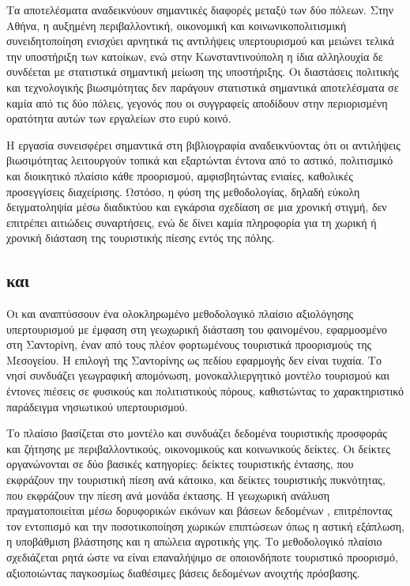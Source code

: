 Τα αποτελέσματα αναδεικνύουν σημαντικές διαφορές μεταξύ των δύο πόλεων.
Στην Αθήνα, η αυξημένη περιβαλλοντική, οικονομική και κοινωνικοπολιτισμική
συνειδητοποίηση ενισχύει αρνητικά τις αντιλήψεις υπερτουρισμού και μειώνει
τελικά την υποστήριξη των κατοίκων, ενώ στην Κωνσταντινούπολη η ίδια
αλληλουχία δε συνδέεται με στατιστικά σημαντική μείωση της υποστήριξης.
Οι διαστάσεις πολιτικής και τεχνολογικής βιωσιμότητας δεν παράγουν
στατιστικά σημαντικά αποτελέσματα σε καμία από τις δύο πόλεις, γεγονός που
οι συγγραφείς αποδίδουν στην περιορισμένη ορατότητα αυτών των εργαλείων
στο ευρύ κοινό.

Η εργασία συνεισφέρει σημαντικά στη βιβλιογραφία αναδεικνύοντας ότι οι
αντιλήψεις βιωσιμότητας λειτουργούν τοπικά και εξαρτώνται έντονα από το
αστικό, πολιτισμικό και διοικητικό πλαίσιο κάθε προορισμού, αμφισβητώντας
ενιαίες, καθολικές προσεγγίσεις διαχείρισης. Ωστόσο, η φύση της μεθοδολογίας,
δηλαδή εύκολη δειγματοληψία μέσω διαδικτύου και εγκάρσια σχεδίαση σε μια
χρονική στιγμή, δεν επιτρέπει αιτιώδεις συναρτήσεις, ενώ δε δίνει καμία
πληροφορία για τη χωρική ή χρονική διάσταση της τουριστικής πίεσης εντός της
πόλης.

\subsection{ και }

Οι  και  \cite{leka2025methodological}
αναπτύσσουν ένα ολοκληρωμένο μεθοδολογικό πλαίσιο αξιολόγησης υπερτουρισμού
με έμφαση στη γεωχωρική διάσταση του φαινομένου, εφαρμοσμένο στη Σαντορίνη,
έναν από τους πλέον φορτωμένους τουριστικά προορισμούς της Μεσογείου. Η
επιλογή της Σαντορίνης ως πεδίου εφαρμογής δεν είναι τυχαία. Το νησί συνδυάζει
γεωγραφική απομόνωση, μονοκαλλιεργητικό μοντέλο τουρισμού και έντονες
πιέσεις σε φυσικούς και πολιτιστικούς πόρους, καθιστώντας το χαρακτηριστικό
παράδειγμα νησιωτικού υπερτουρισμού.

Το πλαίσιο βασίζεται στο μοντέλο  και
συνδυάζει δεδομένα τουριστικής προσφοράς και ζήτησης με περιβαλλοντικούς,
οικονομικούς και κοινωνικούς δείκτες. Οι δείκτες οργανώνονται σε δύο βασικές
κατηγορίες: δείκτες τουριστικής έντασης, που εκφράζουν την τουριστική πίεση
ανά κάτοικο, και δείκτες τουριστικής πυκνότητας, που εκφράζουν την πίεση ανά
μονάδα έκτασης. Η γεωχωρική ανάλυση πραγματοποιείται μέσω δορυφορικών
εικόνων  και βάσεων δεδομένων , επιτρέποντας
τον εντοπισμό και την ποσοτικοποίηση χωρικών επιπτώσεων όπως η αστική
εξάπλωση, η υποβάθμιση βλάστησης και η απώλεια αγροτικής γης. Το
μεθοδολογικό πλαίσιο σχεδιάζεται ρητά ώστε να είναι επαναλήψιμο σε
οποιονδήποτε τουριστικό προορισμό, αξιοποιώντας παγκοσμίως διαθέσιμες βάσεις
δεδομένων ανοιχτής πρόσβασης.

